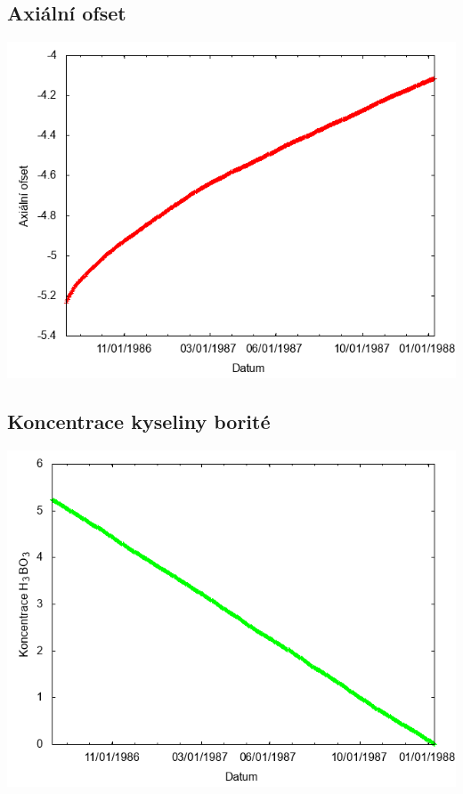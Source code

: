 \documentclass[a4paper,twoside,11pt]{article}
\begin{document}
\subsection*{Axiální ofset}
\begin{center}
\includegraphics[width=.8\textwidth]{graphs/CandyMountain_14_ao.png}
\end{center}

\subsection*{Koncentrace kyseliny borité}
\begin{center}
\includegraphics[width=.8\textwidth]{graphs/CandyMountain_14_bc.png}
\end{center}
\end{document}
